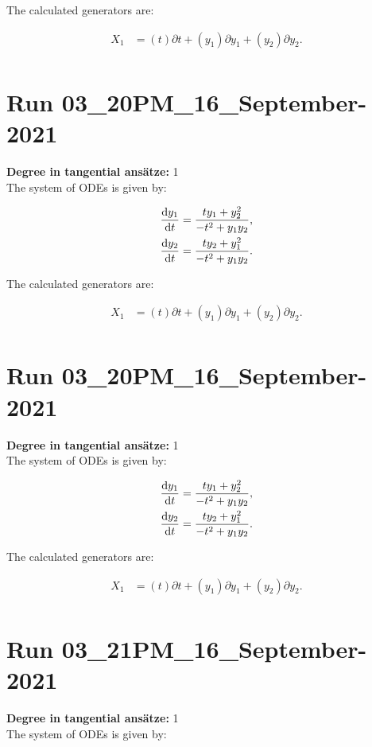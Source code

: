 \noindent The calculated generators are:

\begin{align*}
X_{1}&=\left( t \right)\partial t+\left( y_{1} \right)\partial y_{1}+\left( y_{2} \right)\partial y_{2}.\\
\end{align*}
\section*{Run 03\_20PM\_16\_September-2021}
\textbf{Degree in tangential ansätze:}	1\\
The system of ODEs is given by:

\begin{align*}
\dv{y_{1}}{t}&=\frac{t y_{1} + y_{2}^{2}}{- t^{2} + y_{1} y_{2}},\\
\dv{y_{2}}{t}&=\frac{t y_{2} + y_{1}^{2}}{- t^{2} + y_{1} y_{2}}.\\
\end{align*}

\noindent The calculated generators are:

\begin{align*}
X_{1}&=\left( t \right)\partial t+\left( y_{1} \right)\partial y_{1}+\left( y_{2} \right)\partial y_{2}.\\
\end{align*}
\section*{Run 03\_20PM\_16\_September-2021}
\textbf{Degree in tangential ansätze:}	1\\
The system of ODEs is given by:

\begin{align*}
\dv{y_{1}}{t}&=\frac{t y_{1} + y_{2}^{2}}{- t^{2} + y_{1} y_{2}},\\
\dv{y_{2}}{t}&=\frac{t y_{2} + y_{1}^{2}}{- t^{2} + y_{1} y_{2}}.\\
\end{align*}

\noindent The calculated generators are:

\begin{align*}
X_{1}&=\left( t \right)\partial t+\left( y_{1} \right)\partial y_{1}+\left( y_{2} \right)\partial y_{2}.\\
\end{align*}
\section*{Run 03\_21PM\_16\_September-2021}
\textbf{Degree in tangential ansätze:}	1\\
The system of ODEs is given by:

